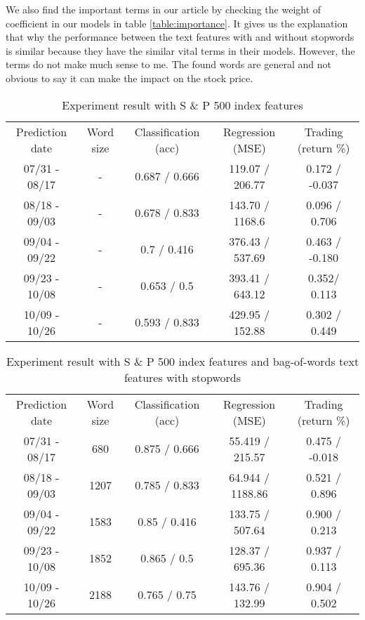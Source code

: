 \documentclass[sigconf]{acmart}
\begin{document}
We also find the important terms in our article by checking the weight of coefficient in our models in table \ref{table:importance}. It gives us the explanation that why the performance between the text features with and
without stopwords is similar because they have the similar vital terms in their models. However, the terms do not make much sense to me. The found words are general and not obvious to say it can make the impact
on the stock price. 

\begin{table*}
\centering
\begin{tabular}{ccccc}
Prediction date & Word size & Classification (acc) & Regression (MSE) & Trading (return \%) \\
07/31 - 08/17   & -         & 0.687 / 0.666        & 119.07 / 206.77  & 0.172 / -0.037      \\
08/18 - 09/03   & -         & 0.678 / 0.833        & 143.70 / 1168.6  & 0.096 / 0.706       \\
09/04 - 09/22   & -         & 0.7 / 0.416          & 376.43 / 537.69  & 0.463 / -0.180      \\
09/23 - 10/08   & -         & 0.653 / 0.5          & 393.41 / 643.12  & 0.352/ 0.113        \\
10/09 - 10/26   & -         & 0.593 / 0.833        & 429.95 /  152.88 & 0.302 / 0.449      
\end{tabular}
\caption{Experiment result with S \& P 500 index features}
\label{table:index}
\end{table*}

\begin{table*}
\centering
\begin{tabular}{ccccc}
Prediction date & Word size & Classification (acc) & Regression (MSE) & Trading (return \%) \\
07/31 - 08/17   & 680       & 0.875 / 0.666        & 55.419 / 215.57  & 0.475 /  -0.018     \\
08/18 - 09/03   & 1207      & 0.785 / 0.833        & 64.944 / 1188.86 & 0.521 /  0.896      \\
09/04 - 09/22   & 1583      & 0.85 / 0.416         & 133.75 / 507.64  & 0.900 /  0.213      \\
09/23 - 10/08   & 1852      & 0.865 / 0.5          & 128.37 / 695.36  & 0.937 / 0.113       \\
10/09 - 10/26   & 2188      & 0.765 / 0.75         & 143.76  / 132.99 & 0.904 / 0.502      
\end{tabular}
\caption{Experiment result with S \& P 500 index features and bag-of-words text features with stopwords}
\label{table:stopwords}
\end{table*}
\end{document}
